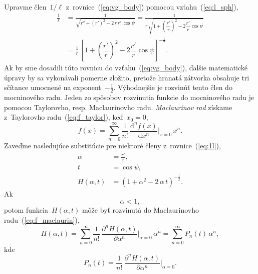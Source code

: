\documentclass[a4paper, 12pt]{book}
\newcommand{\diff}{\mathrm d}
\begin{document}
Upravme člen~$1 \slash \ell$ z~rovnice~(\ref{eq:vg_body}) pomocou 
vzťahu~(\ref{eq:l_sph}),
%
\begin{equation}
\label{eq:1l}
\begin{split}
\frac{1}{\ell} &= \frac{1}{\sqrt{ r^2 + (r')^2 - 2 \, r \, r' \, \cos\psi
}} = \frac{1}{r \, \sqrt{1 + \left( \dfrac{r'}{r}
\right)^2 - 2 \dfrac{r'}{r} \cos\psi}}\\
%
&=\frac{1}{r} \, \left[1 + \left( \dfrac{r'}{r}
\right)^2 - 2 \dfrac{r'}{r} \cos\psi \right]^{-\frac{1}{2}}{.}
\end{split}
\end{equation}
%
Ak by sme dosadili túto rovnicu do vzťahu~(\ref{eq:vg_body}), ďalšie 
matematické úpravy by sa vykonávali pomerne zložito, pretože hranatá zátvorka 
obsahuje tri sčítance umocnené na exponent~$-\frac{1}{2}$.  Výhodnejšie je 
rozvinúť tento člen do mocninového radu.  Jeden zo spôsobov rozvinutia funkcie 
do mocninového radu je pomocou Taylorovho, resp. Maclaurinovho radu.  
\emph{Maclaurinov rad} získame z~Taylorovho radu~(\ref{eq:f_taylor}), keď~$x_0 
= 0$,
%
\begin{equation}
\label{eq:f_maclaurin}
f(x) = \sum_{n = 0}^\infty \frac{1}{n!} \, \frac{\diff^n f(x)}{\diff x^n} 
\bigg\lvert_{x = 0} \, x^n{.}
\end{equation}
%
Zaveďme nasledujúce substitúcie pre niektoré členy z~rovnice~(\ref{eq:1l}),
%
\begin{align}
\label{eq:alpha}
\alpha &= \frac{r'}{r}{,}\\
%
\label{eq:t}
t &= \cos\psi{,}\\
%
\label{eq:generic_function_for_lps}
H(\alpha, t) &= \left(1 + \alpha^2 - 2 \, \alpha\, t \right)^{-\frac{1}{2}}{.}
\end{align}
%
Ak
%
\begin{equation}
\label{eq:alpha_lt_1}
\alpha < 1{,}
\end{equation}
%
potom funkcia~$H(\alpha, t)$ môže byť rozvinutá do Maclaurinovho 
radu~(\ref{eq:f_maclaurin}),
%
\begin{equation}
\label{eq:maclaurin_series_of_generic_function}
H(\alpha, t) = \sum_{n = 0}^\infty \frac{1}{n!} \, \frac{\partial^n H(\alpha,
t)}{\partial \alpha^n} \bigg\lvert_{\alpha = 0} \, \alpha^n = \sum_{n 
= 0}^\infty P_n(t) \, \alpha^n{,}
\end{equation}
%
kde
%
\begin{equation}
\label{eq:pn}
P_n(t) = \frac{1}{n!} \, \frac{\partial^n H(\alpha, t)}{\partial \alpha^n} 
\bigg\lvert_{\alpha = 0}{.}
\end{equation}
\end{document}
